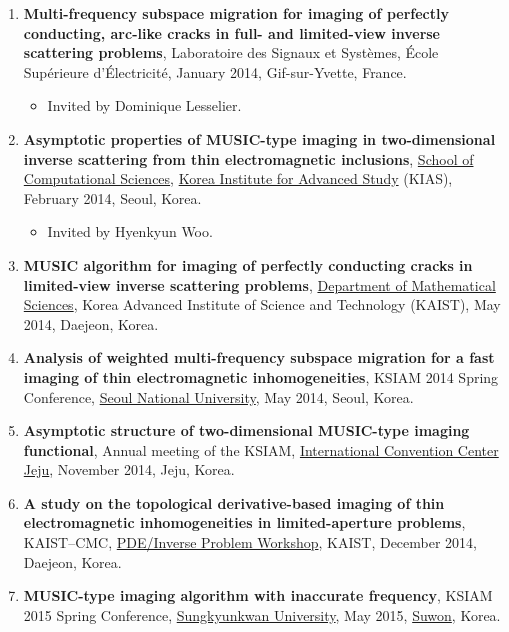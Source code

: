 \documentclass[10pt,A4]{article}
\begin{document}
\begin{enumerate}
\item\label{P-SUPELEC2014B} \textbf{Multi-frequency subspace migration for imaging of perfectly conducting, arc-like cracks in full- and limited-view inverse scattering problems}, Laboratoire des Signaux et Syst\`emes, \'Ecole Sup\'erieure d'\'Electricit\'e, January 2014, Gif-sur-Yvette, France.
\begin{itemize}
\item Invited by Dominique Lesselier.
\end{itemize}
\item\label{P-KIAS2014} \textbf{Asymptotic properties of MUSIC-type imaging in two-dimensional inverse scattering from thin electromagnetic inclusions}, \href{http://www.kias.re.kr/sub03/sub03_03_01.jsp}{School of Computational Sciences}, \href{http://www.kias.re.kr/main/main.jsp}{Korea Institute for Advanced Study} (KIAS), February 2014, Seoul, Korea.
\begin{itemize}
\item Invited by Hyenkyun Woo.
\end{itemize}
\item\label{P-KAIST2014} \textbf{MUSIC algorithm for imaging of perfectly conducting cracks in limited-view inverse scattering problems}, \href{http://mathsci.kaist.ac.kr/home/}{Department of Mathematical Sciences}, Korea Advanced Institute of Science and Technology (KAIST), May 2014, Daejeon, Korea.
\item\label{P-KSIAM2014A} \textbf{Analysis of weighted multi-frequency subspace migration for a fast imaging of thin electromagnetic inhomogeneities}, KSIAM 2014 Spring Conference, \href{http://www.snu.ac.kr}{Seoul National University}, May 2014, Seoul, Korea.
\item\label{P-KSIAM2014B} \textbf{Asymptotic structure of two-dimensional MUSIC-type imaging functional}, Annual meeting of the KSIAM, \href{http://www.iccjeju.co.kr/}{International Convention Center Jeju}, November 2014, Jeju, Korea.
\item\label{P-CMC2014} \textbf{A study on the topological derivative-based imaging of thin electromagnetic inhomogeneities in limited-aperture problems}, KAIST--CMC, \href{http://home.kias.re.kr/MKG/h/KCMCPDE2014/?pageNo=1103}{PDE/Inverse Problem Workshop}, KAIST, December 2014, Daejeon, Korea.
\item\label{P-KSIAM2015A} \textbf{MUSIC-type imaging algorithm with inaccurate frequency}, KSIAM 2015 Spring Conference, \href{http://www.skku.edu/}{Sungkyunkwan University}, May 2015, \href{https://www.suwon.go.kr/intro.jsp}{Suwon}, Korea.

\end{enumerate}
\end{document}
